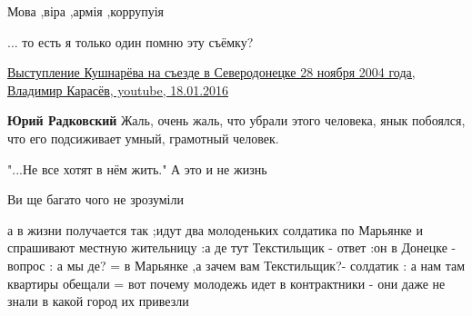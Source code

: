 \begin{itemize}
Мова ,віра ,армія ,коррупуія

 
... то есть я только один помню эту съёмку?

\href{https://www.youtube.com/watch?v=RWiPjzSmmaY}{%
Выступление Кушнарёва на съезде в Северодонецке 28 ноября 2004 года, %
Владимир Карасёв, youtube, 18.01.2016%
}

\begin{itemize}
 
\textbf{Юрий Радковский} Жаль, очень жаль, что убрали этого человека, янык побоялся, что его подсиживает умный, грамотный человек.
\end{itemize}

 
"...Не все хотят в нём жить."
А это и не жизнь

 
Ви ще багато чого не зрозуміли

 

а в жизни получается так ;идут два молоденьких солдатика по Марьянке и
спрашивают местную жительницу :а де тут Текстильщик - ответ :он в Донецке -
вопрос : а мы де? = в Марьянке ,а зачем вам Текстильщик?- солдатик : а нам там
квартиры обещали = вот почему молодежь идет в контрактники - они даже не знали
в какой город их привезли



\end{itemize}
